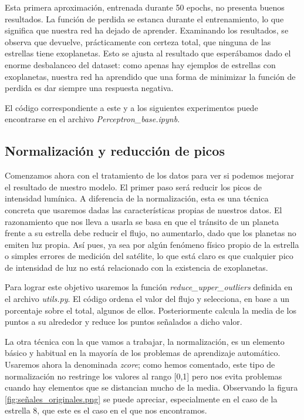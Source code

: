 Esta primera aproximación, entrenada durante 50 epochs, no presenta buenos resultados. La función de perdida se estanca durante el entrenamiento, lo que significa que nuestra red ha dejado de aprender. Examinando los resultados, se observa que devuelve, prácticamente con certeza total, que ninguna de las estrellas tiene exoplanetas. Esto se ajusta al resultado que esperábamos dado el enorme desbalanceo del dataset: como apenas hay ejemplos de estrellas con exoplanetas, nuestra red ha aprendido que una forma de minimizar la función de perdida es dar siempre una respuesta negativa.


El código correspondiente a este y a los siguientes experimentos puede encontrarse en el archivo \textit{Perceptron\_base.ipynb}.

\subsection{Normalización y reducción de picos}

Comenzamos ahora con el tratamiento de los datos para ver si podemos mejorar el resultado de nuestro modelo. El primer paso será reducir los picos de intensidad lumínica. A diferencia de la normalización, esta es una técnica concreta que usaremos dadas las características propias de nuestros datos. El razonamiento que nos lleva a usarla se basa en que el tránsito de un planeta frente a su estrella debe reducir el flujo, no aumentarlo, dado que los planetas no emiten luz propia. Así pues, ya sea por algún fenómeno físico propio de la estrella o simples errores de medición del satélite, lo que está claro es que cualquier pico de intensidad de luz no está relacionado con la existencia de exoplanetas.

Para lograr este objetivo usaremos la función \textit{reduce\_upper\_outliers} definida en el archivo \textit{utils.py}. El código ordena el valor del flujo y selecciona, en base a un porcentaje sobre el total, algunos de ellos. Posteriormente calcula la media de los puntos a su alrededor y reduce los puntos señalados a dicho valor.

La otra técnica con la que vamos a trabajar, la normalización, es un elemento básico y habitual en la mayoría de los problemas de aprendizaje automático. Usaremos ahora la denominada \textit{zcore}; como hemos comentado, este tipo de normalización no restringe los valores al rango [0,1] pero nos evita problemas cuando hay elementos que se distancian mucho de la media. Observando la figura \ref{fig:señales_originales.png}  se puede apreciar, especialmente en el caso de la estrella 8, que este es el caso en el que nos encontramos.

